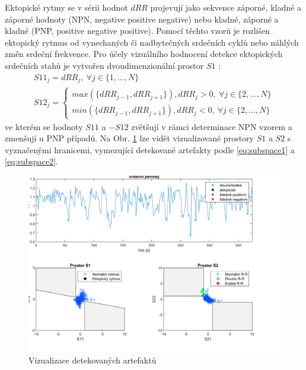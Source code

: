 Ektopické rytmy se v sérii hodnot $dRR$ projevují jako sekvence záporné, kladné
a záporné hodnoty (NPN, negative positive negative) nebo kladné, záporné a
kladné (PNP, positive negative positive). Pomocí těchto vzorů je rozlišen
ektopický rytmus od vynechaných či nadbytečných srdečních cyklů nebo náhlých
změn srdeční frekvence. Pro účely vizuálního hodnocení detekce ektopických
srdečních stahů je vytvořen dvoudimenzionální prostor $S1$ \cite{Lipponen2019}:
\begin{gather}
    S11_j = dRR_j, ~\forall j \in \{1,...,N\} \nonumber \\
    S12_j =
    \begin{cases}
        max(\{dRR_{j-1}, dRR_{j+1}\}), dRR_j > 0, ~\forall j \in \{2,...,N\} \\
        min(\{dRR_{j-1}, dRR_{j+1}\}), dRR_j < 0, ~\forall j \in \{2,...,N\}
    \end{cases}
    \label{eq:subspace1}
\end{gather}
ve kterém se hodnoty $S11$ a $-S12$ zvětšují v rámci determinace NPN vzorem a
zmenšují u PNP případů. Na Obr. \ref{fig:rr_process} lze vidět vizualizované
prostory $S1$ a $S2$ s vyznačenými hranicemi, vymezující detekované artefakty
podle \eqref{eq:subspace1} a \eqref{eq:subspace2}.

\begin{figure}[h]
    \begin{center}
        \includegraphics[width=1\textwidth]{../assets/figures/rr_process}
        \caption{Vizualizace detekovaných artefaktů}
        \label{fig:rr_process}
    \end{center}
\end{figure}


